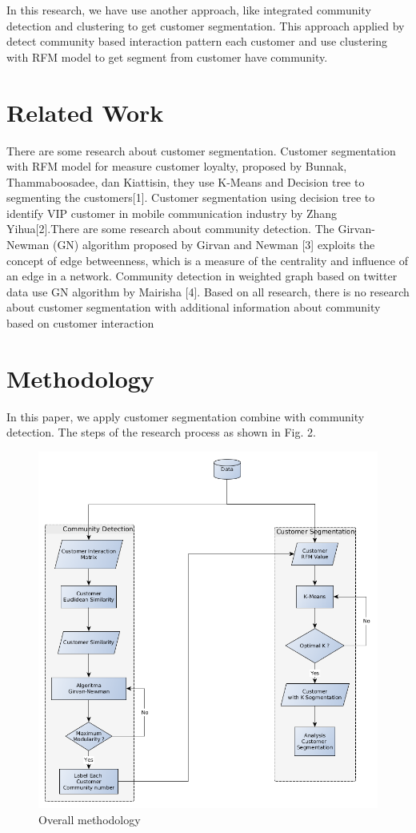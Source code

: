\documentclass[conference]{IEEEtran}
\begin{document}
In this research, we have use another approach, like integrated community detection and clustering to get customer segmentation. This approach applied by detect community based interaction pattern each customer and use clustering with RFM model to get segment from customer have community.



\section{Related Work}
There are some research about customer segmentation. Customer segmentation with RFM model for measure customer loyalty, proposed by Bunnak, Thammaboosadee, dan Kiattisin, they use K-Means and Decision tree to segmenting the customers[1]. Customer segmentation using decision tree to identify VIP customer in mobile communication industry by Zhang Yihua[2].There are some research about community detection. The Girvan-Newman (GN) algorithm proposed by Girvan and Newman [3] exploits the concept of edge betweenness, which is a measure of the centrality and influence of an edge in a network. Community detection in weighted graph based on twitter data use GN algorithm by Mairisha [4]. Based on all research, there is no research about customer segmentation with additional information about community based on customer interaction

\section{Methodology}
In this paper, we apply customer segmentation combine with community detection. The steps of the research process as shown in Fig. 2.

\begin{figure}[h]
\centering
\includegraphics[width=\columnwidth]{figure/overall_methodology}
\caption{Overall methodology}
\label{overall_methodology}
\end{figure}
\end{document}
